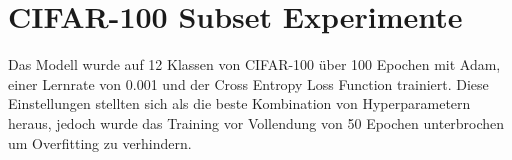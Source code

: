 \section{CIFAR-100 Subset Experimente}\label{section:cifar-experimente}
Das Modell wurde auf 12 Klassen von CIFAR-100 über 100 Epochen mit Adam, einer Lernrate von 0.001 und der Cross Entropy Loss Function
trainiert. Diese Einstellungen stellten sich als die beste Kombination von Hyperparametern heraus, jedoch wurde das Training vor Vollendung 
von 50 Epochen unterbrochen um Overfitting zu verhindern.

